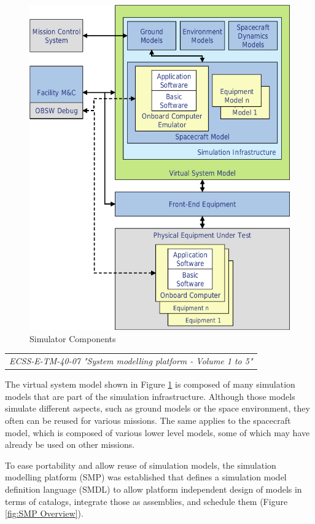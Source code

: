 \begin{figure}[h]
\centering\includegraphics[scale=0.45]{fig/simulator_components}
\caption{Simulator Components}
\label{fig:Simulator Components}
\end{figure}

\begin{tabular}{l}
\textit{ECSS-E-TM-40-07 "System modelling platform - Volume 1 to 5" \cite{ECSS-E-TM-40-07}} \\
\end{tabular}

The virtual system model shown in Figure \ref{fig:Simulator Components} is composed of many simulation models that are part of the simulation infrastructure. Although those models simulate different aspects, such as ground models or the space environment, they often can be reused for various missions. The same applies to the spacecraft model, which is composed of various lower level models, some of which may have already be used on other missions. 

To ease portability and allow reuse of simulation models, the simulation modelling platform (SMP) was established that defines a simulation model definition language (SMDL) to allow platform independent design of models in terms of catalogs, integrate those as assemblies, and schedule them (Figure \ref{fig:SMP Overview}). 


